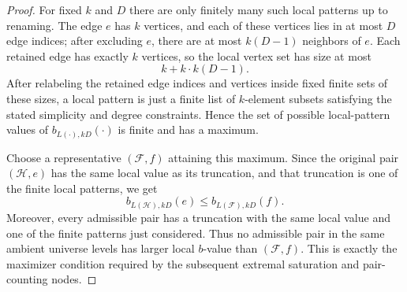 \begin{proof}
For fixed $k$ and $D$ there are only finitely many such local patterns up to
renaming.  The edge $e$ has $k$ vertices, and each of these vertices lies in
at most $D$ edge indices; after excluding $e$, there are at most $k(D-1)$
neighbors of $e$.  Each retained edge has exactly $k$ vertices, so the local
vertex set has size at most
\[
k+k\cdot k(D-1).
\]
After relabeling the retained edge indices and vertices inside fixed finite
sets of these sizes, a local pattern is just a finite list of $k$-element
subsets satisfying the stated simplicity and degree constraints.  Hence the
set of possible local-pattern values of
$b_{L(\cdot),kD}(\cdot)$ is finite and has a maximum.

Choose a representative $(\mathcal F,f)$ attaining this maximum.  Since the
original pair $(\mathcal H,e)$ has the same local value as its truncation,
and that truncation is one of the finite local patterns, we get
\[
b_{L(\mathcal H),kD}(e)\le b_{L(\mathcal F),kD}(f).
\]
Moreover, every admissible pair has a truncation with the same local value
and one of the finite patterns just considered.  Thus no admissible pair in
the same ambient universe levels has larger local $b$-value than
$(\mathcal F,f)$.  This is exactly the maximizer condition required by the
subsequent extremal saturation and pair-counting nodes.
\end{proof}

